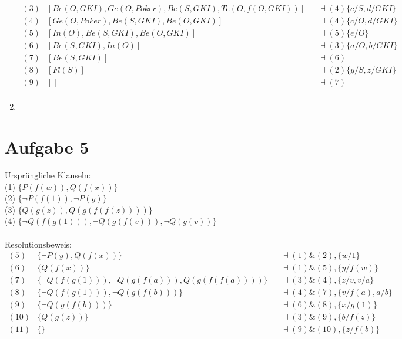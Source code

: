 \documentclass[a4paper,10pt]{article}
\begin{document}
\begin{enumerate}[~~a)]
\begin{align*}
(3)&[Be(O,GKI),Ge(O,Poker),Be(S,GKI),Te(O,f(O,GKI))] &&\dashv (4) \{c/S,d/GKI\} \\
(4)&[Ge(O,Poker),Be(S,GKI),Be(O,GKI)] &&\dashv (4) \{c/O,d/GKI\} \\
(5)&[In(O),Be(S,GKI),Be(O,GKI)] &&\dashv (5) \{e/O\} \\
(6)&[Be(S,GKI),In(O)] &&\dashv (3) \{a/O,b/GKI\} \\
(7)&[Be(S,GKI)] &&\dashv (6) \\
(8)&[Fl(S)] &&\dashv (2) \{y/S,z/GKI\} \\
(9)&[] &&\dashv (7) \\
\end{align*}
    \item
\end{enumerate}

\section*{Aufgabe 5}
Ursprüngliche Klauseln:\\
(1) $\{P(f(w)), Q(f(x))\}$\\
(2) $\{ \lnot P(f(1)), \lnot P(y) \}$\\
(3) $\{Q(g(z)), Q(g(f(f(z))))\}$\\
(4) $\{\lnot Q(f(g(1))), \lnot Q(g(f(v))), \lnot Q(g(v))\}$\\
\\
Resolutionsbeweis:\\
\begin{align*}
(5) &\{\lnot P(y), Q(f(x))\} &&\dashv (1) \& (2), \{w/1\}\\
(6) &\{Q(f(x))\} &&\dashv (1) \& (5), \{y/f(w)\}\\
(7) &\{\lnot Q(f(g(1))), \lnot Q(g(f(a))), Q(g(f(f(a))))\} &&\dashv (3) \& 		(4), \{z/v,v/a\}\\
(8) &\{\lnot Q(f(g(1))), \lnot Q(g(f(b)))\} &&\dashv (4) \& (7), \{v/f(a), 		a/b\}\\
(9) &\{\lnot Q(g(f(b)))\} &&\dashv (6) \& (8), \{x/g(1)\}\\
(10) &\{Q(g(z))\} &&\dashv (3) \& (9), \{b/f(z)\}\\
(11) &\{\} &&\dashv (9) \& (10), \{z/f(b)\}\\
\end{align*}
\end{document}
